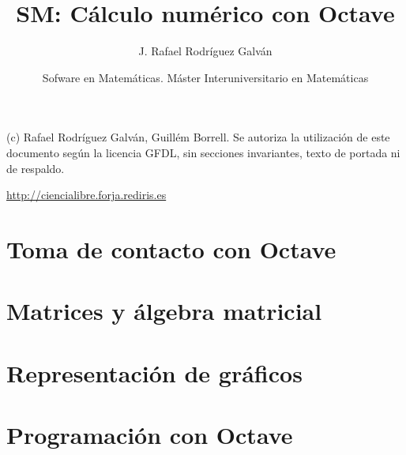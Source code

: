 \documentclass[12pt,xcolor=svgnames,spanish]{beamer}
\title{SM: Cálculo numérico con Octave}
\author{J. Rafael Rodríguez Galván}
\institute[OSLUCA]{Departamento de Matemáticas. Universidad de Cádiz)}
\date[i-MATH, Santiago 2010]{Sofware en Matemáticas. Máster Interuniversitario en Matemáticas}
\begin{document}

\maketitle

\begin{frame}
\vfill\tiny
(c) Rafael Rodríguez Galván, Guillém Borrell.
Se autoriza la utilización de este documento según la licencia GFDL,
sin secciones invariantes, texto de portada ni de respaldo.
\par
\hfill\url{http://ciencialibre.forja.rediris.es}
\end{frame}


\section{Toma de contacto con Octave}


\section{Matrices y álgebra matricial}


\section{Representación de gráficos}


\section{Programación con Octave}

\end{document}
